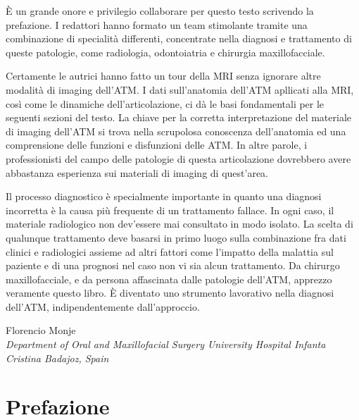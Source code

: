 \documentclass[leqno,10pt,twocolumn,a4paper]{article}
\begin{document}
	\vspace*{0.5cm}
	È un grande onore e privilegio collaborare per questo testo scrivendo la prefazione. I redattori hanno formato un team stimolante tramite una combinazione di specialità differenti, concentrate nella diagnosi e trattamento di queste patologie, come
	radiologia, odontoiatria e chirurgia maxillofacciale.\par Certamente le autrici hanno fatto un tour della MRI senza ignorare altre modalità di imaging dell'ATM. I dati sull'anatomia dell'ATM apllicati alla MRI, così come le dinamiche dell'articolazione,
	ci dà le basi fondamentali per le seguenti sezioni del testo. La chiave per la corretta interpretazione del materiale di imaging dell'ATM si trova nella scrupolosa conoscenza dell'anatomia ed una comprensione delle funzioni e disfunzioni delle ATM.
	In altre parole, i professionisti del campo delle patologie di questa articolazione dovrebbero avere abbastanza esperienza sui materiali di imaging di quest'area.\par Il processo diagnostico è specialmente importante in quanto una diagnosi 
	incorretta è la causa più frequente di un trattamento fallace. In ogni caso, il materiale radiologico non dev'essere mai consultato in modo isolato. La scelta di qualunque trattamento deve basarsi in primo luogo sulla combinazione fra dati clinici
	e radiologici assieme ad altri fattori come l'impatto della malattia sul paziente e di una prognosi nel caso non vi sia alcun trattamento. Da chirurgo maxillofacciale, e da persona affascinata dalle patologie dell'ATM, apprezzo veramente questo libro.
	È diventato uno strumento lavorativo nella diagnosi dell'ATM, indipendentemente dall'approccio.
	\begin{flushright}
		Florencio Monje\\
		\textit{\footnotesize{Department of Oral and Maxillofacial Surgery University Hospital Infanta Cristina Badajoz, Spain}}
	\end{flushright}
	
	\newpage
	
	\thispagestyle{plain}
	
	\section*{Prefazione}
	
\end{document}
